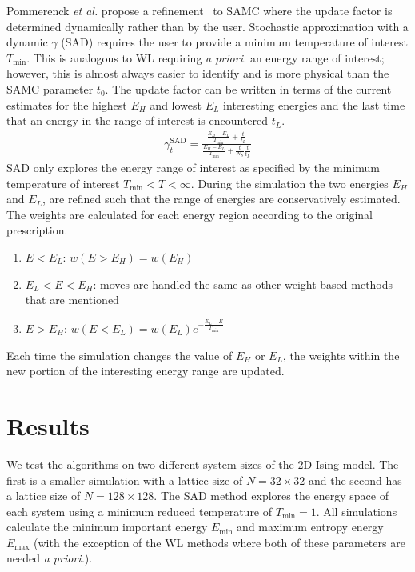 Pommerenck \emph{et al.} propose a refinement~\cite{pommerenck2020stochastic} to SAMC
where the update factor is determined dynamically rather than by the user.
Stochastic approximation with a dynamic $\gamma$ (SAD) requires the user to
provide a minimum temperature of interest $T_{\min}$. This is analogous to WL
requiring \emph{a priori.} an energy range of interest; however, this is almost always easier to
identify and is more physical than the SAMC parameter $t_0$. The update factor
can be written in terms of the current estimates for the highest $E_H$ and
lowest $E_L$ interesting energies and the last time that an energy in the range
of interest is encountered $t_L$.
\begin{align}
  \gamma_{t}^{\text{SAD}} =
     \frac{
       \frac{E_{H}-E_{L}}{T_{\text{min}}} + \frac{t}{t_L}
     }{
       \frac{E_{H}-E_{L}}{T_{\text{min}}} + \frac{t}{N_S}\frac{t}{t_L}
     }
\end{align}
SAD only explores the energy range of interest as specified by the minimum
temperature of interest $T_{\min} < T < \infty$. During the simulation the two
energies $E_H$ and $E_L$, are refined such that the range of energies are
conservatively estimated. The weights are calculated for each energy region according to the original prescription.
\begin{enumerate}
\item {$E < E_L$:} $w(E>E_H) = w(E_H)$
\item {$E_L < E < E_H$:} moves are handled the same as other weight-based
methods that are mentioned
\item {$E > E_H$:} $w(E<E_L) = w(E_L)e^{-\frac{E_L-E}{T_{\min}}}$
\end{enumerate}
Each time the simulation changes the value of $E_H$ or $E_L$, the weights
within the new portion of the interesting energy range are updated.

\section{Results}
We test the algorithms on two different system sizes of the 2D Ising model.
The first is a smaller simulation with a lattice size of $N = 32 \times 32$ and
the second has a lattice size of $N = 128 \times 128$. The SAD method explores 
the energy space of each system using a minimum reduced temperature of $T_{\text{min}} = 1$. All simulations calculate the minimum important energy $E_{\min}$
and maximum entropy energy $E_{\max}$ (with the exception of the WL methods
where both of these parameters are needed \emph{a priori.}).

